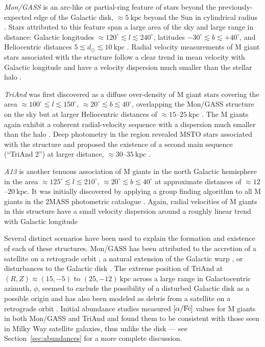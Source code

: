 \documentclass[galaxies,article,submit,moreauthors,pdftex,10pt,a4paper]{mdpi}
\newcommand{\kpc}{\mathrm{kpc}}
\begin{document}
\begin{description}
\item{\it Mon/GASS} is an arc-like or partial-ring feature of stars beyond the previously-expected edge of the Galactic disk, $\approx 5~\kpc$ beyond the Sun in cylindrical radius \cite{robin92}.
Stars attributed to this feature span a large area of the sky and large range
in distance: Galactic longitudes $\approx 120^\circ \lesssim l \lesssim
240^\circ$, latitudes $-30^\circ \lesssim b \lesssim +40^\circ$, and
Heliocentric distances $5\lesssim d_\odot \lesssim 10~\kpc$
\cite{Morganson:2016}.
Radial velocity measurements of M giant stars associated with the structure
follow a clear trend in mean velocity with Galactic longitude and have a
velocity dispersion much smaller than the stellar halo \cite{crane03}.
\item{\it TriAnd} was first discovered as a diffuse over-density of M giant
stars covering the area $\approx 100^\circ \lesssim l \lesssim 150^\circ$,
$\approx 20^\circ \lesssim b \lesssim 40^\circ$, overlapping the Mon/GASS
structure on the sky but at larger Heliocentric distances of $\approx
15$--$25~\kpc$ \cite{rochapinto04}.
The M giants again exhibit a coherent radial-velocity sequence with a
dispersion much smaller than the halo \cite{rochapinto04}.
Deep photometry in the region revealed MSTO stars associated with the structure
and proposed the existence of a second main sequence (``TriAnd 2'') at larger
distance, $\approx 30$--$35~\kpc$ \cite{martin07,martin14}.
\item{\it A13} is another tenuous association of M giants in the north Galactic
hemisphere in the area $\approx 125^\circ \lesssim l \lesssim 210^\circ$,
$\approx 20^\circ \lesssim b \lesssim 40^\circ$ at approximate distances of
$\approx 12$--$20~\kpc$.
It was initially discovered by applying a group finding algorithm
\cite{sharma09} to all M giants in the 2MASS photometric catalogue
\cite{sharma10}.
Again, radial velocities of M giants in this structure have a small velocity
dispersion around a roughly linear trend with Galactic longitude \cite{li17}
\end{description}

Several distinct scenarios have been used to explain the formation and
existence of each of these structures.
Mon/GASS has been attributed to the accretion of a satellite on a retrograde orbit \cite{penarrubia05}, a natural extension of the Galactic warp \cite{momany04,momany06}, or disturbances to the Galactic disk \cite{kazantzidis08,younger08,purcell11,xu15,gomez16}.
The extreme position of TriAnd at $(R,Z) \approx (15, -5)$ to $(25,-12)~\kpc$
across a large range in Galactocentric azimuth, $\phi$, seemed to exclude the
possibility of a disturbed Galactic disk as a possible origin and has also been
modeled as debris from a satellite on a retrograde orbit \cite{sheffield14}.
Initial abundance studies measured $[\alpha/{\rm Fe}]$ values for M giants in both Mon/GASS and TriAnd and found them to be consistent with those seen in Milky Way satellite galaxies, thus unlike the disk \cite{chou2010b,chou11} --- see Section~\ref{sec:abundances} for a more complete discussion.
\end{document}
